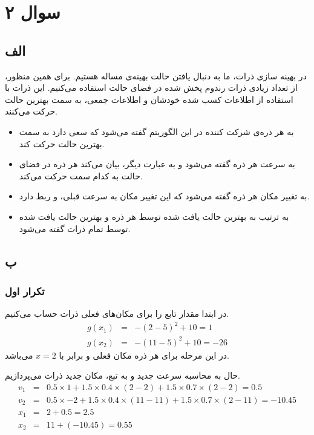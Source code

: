 \documentclass[12pt]{article}
\begin{document}
	 \section{سوال ۲}
	 \subsection{الف}
	 در بهینه سازی ذرات، ما به دنبال یافتن حالت بهینه‌ی مساله هستیم. برای همین منظور،  از تعداد زیادی ذرات رندوم پخش شده در فضای حالت استفاده می‌کنیم. این ذرات با استفاده از اطلاعات کسب شده خودشان و اطلاعات جمعی، ‌به سمت بهترین حالت حرکت می‌کنند.
	 \begin{itemize}
	 	\item \textbf{} به هر ذره‌ی شرکت کننده در این الگوریتم گفته می‌شود که سعی دارد به سمت بهترین حالت حرکت کند.
	 	\item \textbf{} به سرعت هر ذره گفته می‌شود و به عبارت دیگر، بیان می‌کند هر ذره در فضای حالت به کدام سمت حرکت می‌کند.
	 	\item \textbf{} به تغییر مکان هر ذره گفته می‌شود که این تغییر مکان به سرعت قبلی،  و  ربط دارد.
	 	\item \textbf{} به ترتیب به بهترین حالت یافت شده توسط هر ذره و بهترین حالت یافت شده توسط تمام ذرات گفته می‌شود.
	 \end{itemize}
	 \subsection{ب}
	 \subsubsection{تکرار اول}
	 در ابتدا مقدار تابع  را برای مکان‌های فعلی ذرات حساب می‌کنیم.
	 \begin{eqnarray*}
	 	g(x_{1}) &=& -(2-5)^{2} + 10 = 1\\
	 	g(x_{2}) &=& -(11-5)^{2} + 10 = -26
	 \end{eqnarray*}
	 در این مرحله  برای هر ذره مکان فعلی و  برابر با $x=2$ می‌باشد.
	 
	 حال به محاسبه سرعت جدید و به تبع، مکان جدید ذرات می‌پردازیم.
	 \begin{eqnarray*}
	 	v_{1} &=& 0.5 \times 1 + 1.5\times 0.4 \times (2-2) + 1.5 \times 0.7 \times (2 - 2) = 0.5\\
	 	v_{2} &=& 0.5 \times -2 + 1.5\times 0.4\times(11 - 11) + 1.5\times 0.7\times(2 - 11) = -10.45\\
	 	x_{1} &=& 2 + 0.5 = 2.5\\
	 	x_{2} &=& 11 + (-10.45) = 0.55
	 \end{eqnarray*}
\end{document}
